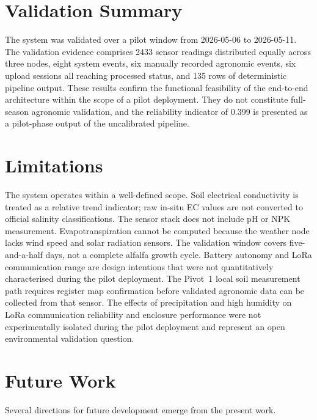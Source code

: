 \section*{Validation Summary}

The system was validated over a pilot window from 2026-05-06 to 2026-05-11.
The validation evidence comprises 2433 sensor readings distributed equally across
three nodes, eight system events, six manually recorded agronomic events,
six upload sessions all reaching processed status, and 135 rows of deterministic
pipeline output. These results confirm the functional feasibility of the
end-to-end architecture within the scope of a pilot deployment. They do not
constitute full-season agronomic validation, and the reliability indicator of
0.399 is presented as a pilot-phase output of the uncalibrated pipeline.

\section*{Limitations}

The system operates within a well-defined scope. Soil electrical conductivity
is treated as a relative trend indicator; raw in-situ EC values are not converted
to official salinity classifications. The sensor stack does not include pH or NPK
measurement. Evapotranspiration cannot be computed because the weather node lacks
wind speed and solar radiation sensors. The validation window covers five-and-a-half
days, not a complete alfalfa growth cycle. Battery autonomy and LoRa communication
range are design intentions that were not quantitatively characterised during the
pilot deployment. The Pivot~1 local soil measurement path requires register map
confirmation before validated agronomic data can be collected from that sensor.
The effects of precipitation and high humidity on LoRa communication reliability
and enclosure performance were not experimentally isolated during the pilot
deployment and represent an open environmental validation question.

\section*{Future Work}

Several directions for future development emerge from the present work.


